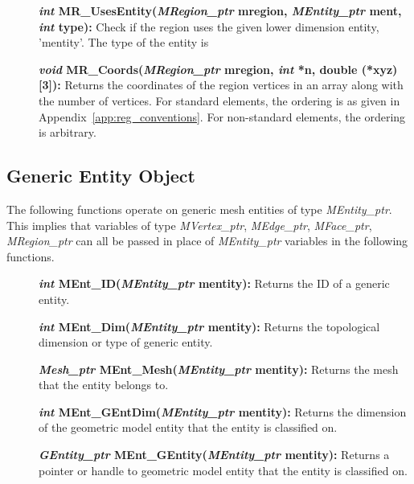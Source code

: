 \documentclass[12pt]{article}
\begin{document}
\begin{description}
\item[]\textbf{\textit{int} MR\_UsesEntity(\textit{MRegion\_ptr} mregion,
\textit{MEntity\_ptr} ment, \textit{int} type):} Check if the region
uses the given lower dimension entity, 'mentity'. The type of the
entity is


\item[]\textbf{\textit{void} MR\_Coords(\textit{MRegion\_ptr} mregion,
\textit{int} *n, double (*xyz)[3]):} Returns the coordinates of the
region vertices in an array along with the number of vertices. For
standard elements, the ordering is as given in
Appendix~\ref{app:reg_conventions}. For non-standard elements, the
ordering is arbitrary.
\end{description}



\newpage
\subsection{Generic Entity Object}

The following functions operate on generic mesh entities of type
\textit{MEntity\_ptr}. This implies that variables of type
\textit{MVertex\_ptr}, \textit{MEdge\_ptr}, \textit{MFace\_ptr},
\textit{MRegion\_ptr} can all be passed in place of
\textit{MEntity\_ptr} variables in the following functions.

\begin{description}

  
\item[]\textbf{\textit{int} MEnt\_ID(\textit{MEntity\_ptr} mentity):} Returns
the ID of a generic entity.

\item[]\textbf{\textit{int} MEnt\_Dim(\textit{MEntity\_ptr} mentity):}
Returns the topological dimension or type of generic entity.

\item[]\textbf{\textit{Mesh\_ptr} MEnt\_Mesh(\textit{MEntity\_ptr} mentity):}
Returns the mesh that the entity belongs to.

\item[]\textbf{\textit{int} MEnt\_GEntDim(\textit{MEntity\_ptr} mentity):}
Returns the dimension of the geometric model entity that the entity is
classified on.

\item[]\textbf{\textit{GEntity\_ptr} MEnt\_GEntity(\textit{MEntity\_ptr} mentity):}
Returns a pointer or handle to geometric model entity that the entity
is classified on.
\end{description}
\end{document}
